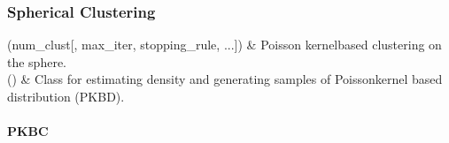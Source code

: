 \documentclass[letterpaper,10pt,english,openany,oneside]{sphinxmanual}
\begin{document}
{{{{\subsubsection{Spherical Clustering}
\label{\detokenize{api_reference/index:spherical-clustering}}\label{\detokenize{api_reference/index:module-QuadratiK.spherical_clustering}}

\begin{savenotes}\sphinxattablestart
\sphinxthistablewithglobalstyle
\sphinxthistablewithnovlinesstyle
\centering
\begin{tabulary}{\linewidth}[t]{}
\sphinxtoprule
\sphinxtableatstartofbodyhook
\sphinxAtStartPar
{\hyperref[\detokenize{api_reference/generated/QuadratiK.spherical_clustering.PKBC:QuadratiK.spherical_clustering.PKBC}]{}}(num\_clust{[}, max\_iter, stopping\_rule, ...{]})
&
\sphinxAtStartPar
Poisson kernel\sphinxhyphen{}based clustering on the sphere.
\\
\sphinxhline
\sphinxAtStartPar
{\hyperref[\detokenize{api_reference/generated/QuadratiK.spherical_clustering.PKBD:QuadratiK.spherical_clustering.PKBD}]{}}()
&
\sphinxAtStartPar
Class for estimating density and generating samples of Poisson\sphinxhyphen{}kernel based distribution (PKBD).
\\
\sphinxbottomrule
\end{tabulary}
\sphinxtableafterendhook\par
\sphinxattableend\end{savenotes}

\sphinxstepscope


\paragraph{PKBC}
\label{\detokenize{api_reference/generated/QuadratiK.spherical_clustering.PKBC:pkbc}}\label{\detokenize{api_reference/generated/QuadratiK.spherical_clustering.PKBC::doc}}

}}}}
\end{document}
